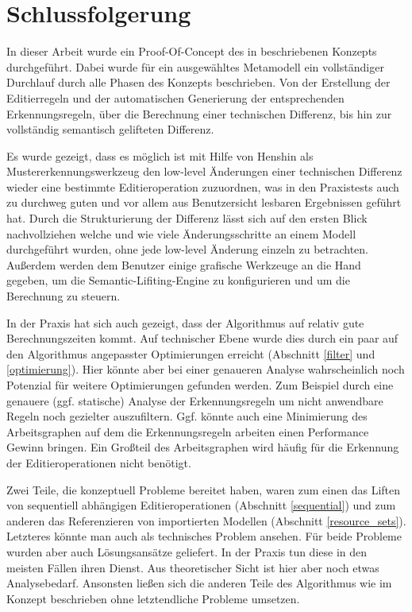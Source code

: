 \chapter{Schlussfolgerung}
\label{schlussfolgerung}

In dieser Arbeit wurde ein Proof-Of-Concept des in \cite{KeKT2011ASE} beschriebenen Konzepts
durchgeführt. Dabei wurde für ein ausgewähltes Metamodell ein vollständiger Durchlauf durch alle
Phasen des Konzepts beschrieben. Von der Erstellung der Editierregeln und der automatischen
Generierung der entsprechenden Erkennungsregeln, über die Berechnung einer technischen Differenz,
bis hin zur vollständig semantisch gelifteten Differenz. 

Es wurde gezeigt, dass es möglich ist mit Hilfe von Henshin als Mustererkennungswerkzeug den
low-level Änderungen einer technischen Differenz wieder eine bestimmte Editieroperation zuzuordnen,
was in den Praxistests auch zu durchweg guten und vor allem aus Benutzersicht lesbaren Ergebnissen
geführt hat. Durch die Strukturierung der Differenz lässt sich auf den ersten Blick nachvollziehen
welche und wie viele Änderungsschritte an einem Modell durchgeführt wurden, ohne jede low-level
Änderung einzeln zu betrachten. Außerdem werden dem Benutzer einige grafische Werkzeuge an die Hand
gegeben, um die Semantic-Lifiting-Engine zu konfigurieren und um die Berechnung zu steuern.

In der Praxis hat sich auch gezeigt, dass der Algorithmus auf relativ gute Berechnungszeiten
kommt. Auf technischer Ebene wurde dies durch ein paar auf den Algorithmus angepasster
Optimierungen erreicht (Abschnitt \ref{filter} und \ref{optimierung}). Hier könnte aber bei
einer genaueren Analyse wahrscheinlich noch Potenzial für weitere Optimierungen gefunden werden. Zum
Beispiel durch eine genauere (ggf. statische) Analyse der Erkennungsregeln um nicht anwendbare
Regeln noch gezielter auszufiltern. Ggf. könnte auch eine Minimierung des Arbeitsgraphen auf dem die
Erkennungsregeln arbeiten einen Performance Gewinn bringen. Ein Großteil des Arbeitsgraphen wird
häufig für die Erkennung der Editieroperationen nicht benötigt.

Zwei Teile, die konzeptuell Probleme bereitet haben, waren zum einen das Liften von sequentiell
abhängigen Editieroperationen (Abschnitt \ref{sequential}) und zum anderen das Referenzieren von
importierten Modellen (Abschnitt \ref{resource_sets}). Letzteres könnte man auch als
technisches Problem ansehen. Für beide Probleme wurden aber auch Lösungsansätze geliefert. In der
Praxis tun diese in den meisten Fällen ihren Dienst. Aus theoretischer Sicht ist hier aber noch
etwas Analysebedarf. Ansonsten ließen sich die anderen Teile des Algorithmus wie im Konzept
\cite{KeKT2011ASE} beschrieben ohne letztendliche Probleme umsetzen.

